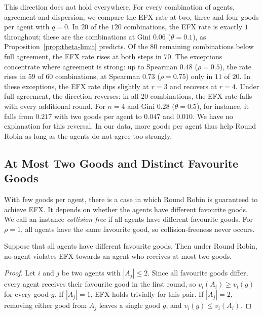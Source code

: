 This direction does not hold everywhere. For every combination of agents, agreement and
dispersion, we compare the EFX rate at two, three and four goods per agent with $q=0$. In $20$ of
the $120$ combinations, the EFX rate is exactly $1$ throughout; these are the combinations at Gini
$0.06$ ($\theta=0.1$), as Proposition~\ref{prop:theta-limit} predicts. Of the $80$ remaining
combinations below full agreement, the EFX rate rises at both steps in $70$. The exceptions
concentrate where agreement is strong: up to Spearman $0.48$ ($\rho=0.5$), the rate rises in $59$
of $60$ combinations, at Spearman $0.73$ ($\rho=0.75$) only in $11$ of $20$. In these exceptions,
the EFX rate dips slightly at $r=3$ and recovers at $r=4$. Under full agreement, the direction
reverses: in all $20$ combinations, the EFX rate falls with every additional round. For $n=4$ and
Gini $0.28$ ($\theta=0.5$), for instance, it falls from $0.217$ with two goods per agent to $0.047$
and $0.010$. We have no explanation for this reversal. In our data, more goods per agent thus help
Round Robin as long as the agents do not agree too strongly.

\subsection{At Most Two Goods and Distinct Favourite Goods}\label{sec:bundlesize}

With few goods per agent, there is a case in which Round Robin is guaranteed to achieve EFX. It
depends on whether the agents have different favourite goods. We call an instance
\textit{collision-free} if all agents have different favourite goods. For $\rho=1$, all agents
have the same favourite good, so collision-freeness never occurs.

\begin{lemma}\label{lem:bundlesize}
Suppose that all agents have different favourite goods. Then under Round Robin, no agent violates
EFX towards an agent who receives at most two goods.
\end{lemma}

\begin{proof}
Let $i$ and $j$ be two agents with $|A_j|\leq2$. Since all favourite goods differ, every agent receives their favourite good in the first round, so
$v_i(A_i)\geq v_i(g)$ for every good $g$. If $|A_j|=1$, EFX holds trivially for this pair. If
$|A_j|=2$, removing either good from $A_j$ leaves a single good $g$, and
$v_i(g)\leq v_i(A_i)$.
\end{proof}

